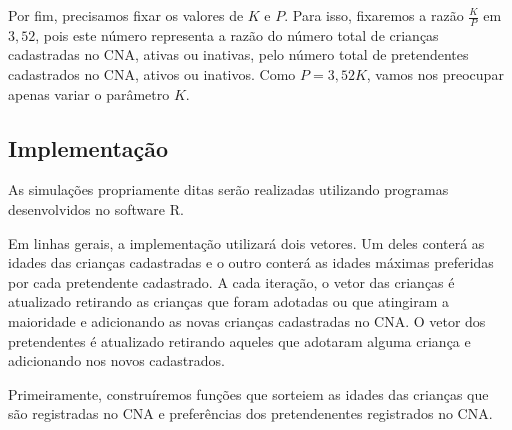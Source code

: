 \documentclass[]{book}
\begin{document}
Por fim, precisamos fixar os valores de \(K\) e \(P\). Para isso,
fixaremos a razão \(\frac{K}{P}\) em \(3,52\), pois este número
representa a razão do número total de crianças cadastradas no CNA,
ativas ou inativas, pelo número total de pretendentes cadastrados no
CNA, ativos ou inativos. Como \(P=3,52K\), vamos nos preocupar apenas
variar o parâmetro \(K\).

\subsection{Implementação}\label{implementacao-1}

As simulações propriamente ditas serão realizadas utilizando programas
desenvolvidos no software R.

Em linhas gerais, a implementação utilizará dois vetores. Um deles
conterá as idades das crianças cadastradas e o outro conterá as idades
máximas preferidas por cada pretendente cadastrado. A cada iteração, o
vetor das crianças é atualizado retirando as crianças que foram adotadas
ou que atingiram a maioridade e adicionando as novas crianças
cadastradas no CNA. O vetor dos pretendentes é atualizado retirando
aqueles que adotaram alguma criança e adicionando nos novos cadastrados.

Primeiramente, construíremos funções que sorteiem as idades das crianças
que são registradas no CNA e preferências dos pretendenentes registrados
no CNA.
\end{document}
